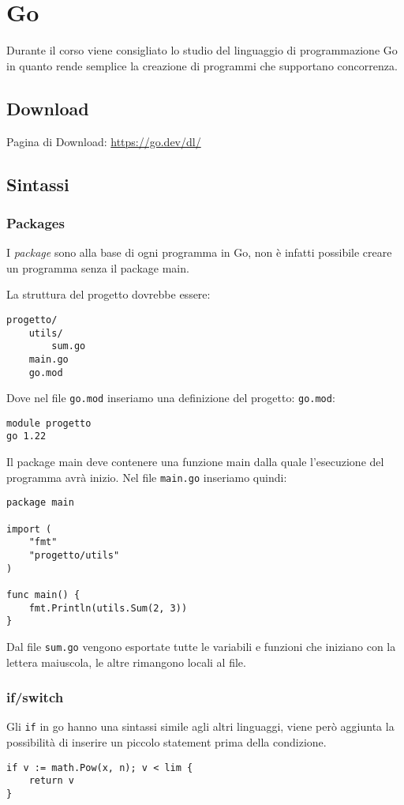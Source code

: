 \chapter{Go}
Durante il corso viene consigliato lo studio del linguaggio di programmazione Go in quanto rende semplice la creazione di programmi che supportano concorrenza.

\section{Download}
Pagina di Download: \href{https://go.dev/dl/}{https://go.dev/dl/}

\section{Sintassi}

\subsection{Packages}
I \textit{package} sono alla base di ogni programma in Go, non è infatti possibile creare un programma senza il package main.

\spacer
La struttura del progetto dovrebbe essere:
\begin{verbatim}
progetto/
    utils/
        sum.go
    main.go
    go.mod
\end{verbatim}

\spacer
Dove nel file \texttt{go.mod} inseriamo una definizione del progetto:
\texttt{go.mod}:
\begin{verbatim}
module progetto
go 1.22
\end{verbatim}

\spacer
Il package main deve contenere una funzione main dalla quale l'esecuzione del programma avrà inizio. Nel file \texttt{main.go} inseriamo quindi:
\begin{verbatim}
package main

import (
    "fmt"
    "progetto/utils"
)

func main() {
    fmt.Println(utils.Sum(2, 3))
}
\end{verbatim}

Dal file \texttt{sum.go} vengono esportate tutte le variabili e funzioni che iniziano con la lettera maiuscola, le altre rimangono locali al file.

\subsection{if/switch}
Gli \texttt{if} in go hanno una sintassi simile agli altri linguaggi, viene però aggiunta la possibilità di inserire un piccolo statement prima della condizione.
\begin{verbatim}
if v := math.Pow(x, n); v < lim {
    return v
}
\end{verbatim}

